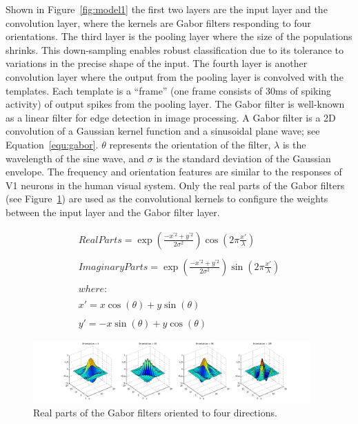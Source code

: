 \documentclass[journal]{journal}
\begin{document}
Shown in Figure~\ref{fig:model1} the first two layers are the input layer and the convolution layer, where the kernels are Gabor filters responding to four orientations. 
The third layer is the pooling layer where the size of the populations shrinks. 
This down-sampling enables robust classification due to its tolerance to variations in the precise shape of the input. 
The fourth layer is another convolution layer where the output from the pooling layer is convolved with the templates. 
Each template is a “frame” (one frame consists of 30ms of spiking activity) of output spikes from the pooling layer.
The Gabor filter is well-known as a linear filter for edge detection in image processing. 
A Gabor filter is a 2D convolution of a Gaussian kernel function and a sinusoidal plane wave; see Equation~\ref{equ:gabor}. 
$\theta$ represents the orientation of the filter, $\lambda$ is the wavelength of the sine wave, and $\sigma$ is the standard deviation of the Gaussian envelope. 
The frequency and orientation features are similar to the responses of V1 neurons in the human visual system. 
Only the real parts of the Gabor filters (see Figure~\ref{fig:gabor}) are used as the convolutional kernels to configure the weights between the input layer and the Gabor filter layer.

\begin{equation}
\begin{array}{l}
Real Parts = \exp (\frac{-x^{'2}+y^{'2}}{2\sigma ^{2}})\cos (2\pi\frac{{x}'}{\lambda })
\\
\\
Imaginary Parts = \exp (\frac{-x^{'2}+y^{'2}}{2\sigma ^{2}})\sin (2\pi\frac{{x}'}{\lambda })
\\
\\
where:
\\
\\
{x}'=x\cos (\theta ) + y\sin (\theta)
\\
\\
{y}'=-x\sin (\theta ) + y\cos (\theta)
\end{array}
\label{equ:gabor}
\end{equation}


\begin{figure}
\centering
	\includegraphics[width=0.95\textwidth]{pics/gabor.png}
	\caption{Real parts of the Gabor filters oriented to four directions.}
	\label{fig:gabor}
\end{figure}
\end{document}
